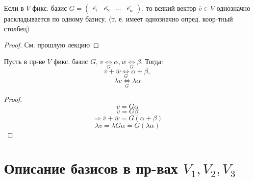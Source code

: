 \begin{statement}
    Если в $V$ фикс. базис $G = \begin{pmatrix}\overline{e_1} & \overline{e_2} & \ldots & \overline{e_n} \end{pmatrix}$, то всякий вектор $\overline{v} \in V$ однозначно раскладывается по одному базису. (т. е. имеет однозначно опред. коор-тный столбец)
\end{statement}
\begin{proof}
См. прошлую лекцию
\end{proof}
\begin{statement}
Пусть в пр-ве $V$ фикс. базис $G$, $\overline{v} \underset{G}{\Longleftrightarrow} \alpha, \overline{w} \underset{G}{\Longleftrightarrow} \beta$. Тогда:
\[
\overline{v} + \overline{w} \underset{G}{\Longleftrightarrow} \alpha + \beta,
\] 
\[
\lambda \overline{v} \underset{G}{\Longleftrightarrow} \lambda \alpha
\] 
\end{statement}
\begin{proof}
\[
\overline{v} = G \alpha
\] 
\[
\overline{v} = G \beta
\] 
\[
\Rightarrow \overline{v} + \overline{w} = G(\alpha + \beta)
\] 
\[
\lambda \overline{v} = \lambda G \alpha = G (\lambda \alpha)
\] 
\end{proof}
\section{Описание базисов в пр-вах $V_1, V_2, V_3$}


